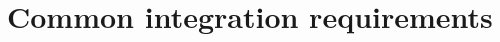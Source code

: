 \documentclass[Main]{subfiles}
\begin{document}
\section{Common integration requirements}
\end{document}
